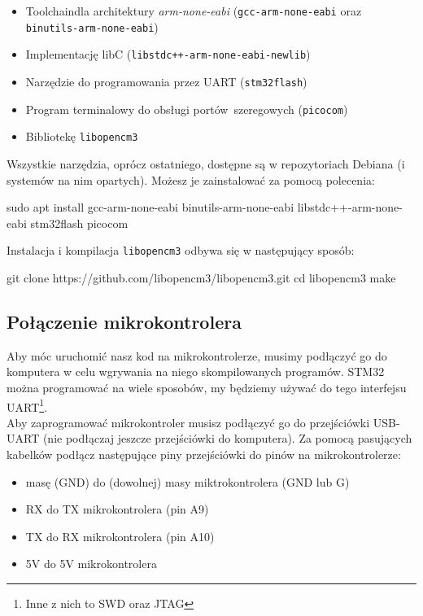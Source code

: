 \documentclass{pdfBooklets}
\begin{document}
\begin{itemize}
\item Toolchain\footnotemark  dla architektury \emph{arm-none-eabi} (\Verb$gcc-arm-none-eabi$ oraz \Verb$binutils-arm-none-eabi$)
\item Implementację libC (\Verb$libstdc++-arm-none-eabi-newlib$)
\item Narzędzie do programowania przez UART (\Verb$stm32flash$)
\item Program terminalowy do obsługi portów~szeregowych (\Verb$picocom$)
\item Bibliotekę \Verb$libopencm3$
\end{itemize}
Wszystkie narzędzia, oprócz ostatniego, dostępne są w repozytoriach Debiana (i systemów na nim opartych). Możesz je zainstalować
za pomocą polecenia:

\begin{CodeFrame*}[bash]{}
sudo apt install gcc-arm-none-eabi binutils-arm-none-eabi libstdc++-arm-none-eabi stm32flash picocom
\end{CodeFrame*}

Instalacja i kompilacja \Verb$libopencm3$ odbywa się w następujący sposób:

\begin{CodeFrame*}[bash]{}
git clone https://github.com/libopencm3/libopencm3.git
cd libopencm3
make
\end{CodeFrame*}

\subsection{Połączenie mikrokontrolera}
Aby móc uruchomić nasz kod na mikrokontrolerze, musimy podłączyć go do komputera w celu wgrywania na niego skompilowanych programów.
STM32 można programować na wiele sposobów, my będziemy używać do tego interfejsu UART\footnote{Inne z nich to SWD oraz JTAG}.\\

Aby zaprogramować mikrokontroler musisz podłączyć go do przejściówki USB-UART (nie podłączaj jeszcze
przejściówki do komputera).
Za pomocą pasujących kabelków podłącz następujące piny przejściówki do pinów na mikrokontrolerze:
\begin{itemize}
\item masę (GND) do (dowolnej) masy miktrokontrolera (GND lub G)
\item RX do TX mikrokontrolera (pin A9)
\item TX do RX mikrokontrolera (pin A10)
\item 5V do 5V mikrokontrolera
\end{itemize}
\end{document}
